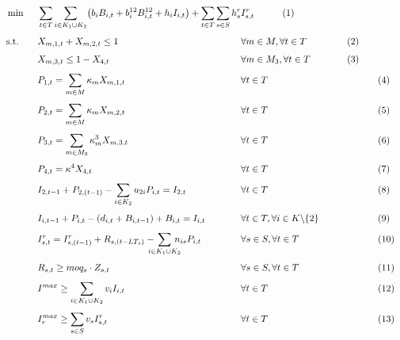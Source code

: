 \documentclass[11pt]{article}
\begin{document}
\begin{alignat}{4}
&\min && \sum_{t\in T}\sum_{i \in K_1 \cup K_2}\bigl(b_iB_{i,t}+b_i^{12}B_{i,t}^{12}+h_iI_{i,t}\bigr)
+ \sum_{t\in T}\sum_{s\in S}h^r_s I^r_{s,t} & \tag{1} \\[4pt]
&\text{s.t.} \quad
&& X_{m,1,t}+X_{m,2,t}\leq 1 && \hspace{-2cm} \forall m\in M,\forall t\in T  &\tag{2} \\[4pt]
&&& X_{m,3,t}\leq 1-X_{4,t} && \hspace{-2cm} \forall m\in M_3,\forall t\in T  &\tag{3} \\[4pt]
&&& P_{1,t}= \sum_{m\in M}\kappa_m X_{m,1,t} && \hspace{-2cm} \forall t\in T &&\tag{4}\\[4pt]
&&& P_{2,t}= \sum_{m\in M}\kappa_m X_{m,2,t} && \hspace{-2cm}\forall t\in T &&\tag{5}\\[4pt]
&&& P_{3,t}= \sum_{m\in M_3}\kappa^{3}_m X_{m,3,t} &&\hspace{-2cm} \forall t\in T &&\tag{6}\\[4pt]
&&& P_{4,t}= \kappa^{4} X_{4,t} &&\hspace{-2cm} \forall t\in T &&\tag{7}\\[4pt]
&&& I_{2,t-1}+P_{2,(t-1)}-\sum_{i\in K_2} u_{2i}P_{i,t} = I_{2,t} \quad && \hspace{-2cm} \forall t\in T &&\tag{8}\\[4pt]
&&& I_{i,t-1}+P_{i,t} - (d_{i,t}+B_{i,t-1})+B_{i,t} = I_{i,t}
&& \hspace{-2cm} \forall t\in T, \forall i\in K\backslash \{2\}  &&\tag{9}\\[4pt]
&&& I_{s,t}^{r}
= I_{s,(t-1)}^{r} + R_{s,(t-LT_s)}
-\hspace{-0.3cm}\sum_{i \in K_1 \cup K_2}\hspace{-0.3cm} n_{is}  P_{i,t}
&& \hspace{-2cm} \forall s\in S,\forall t\in T &&\tag{10}\\[4pt]
&&& R_{s,t} \ge moq_s \cdot Z_{s,t}&& \hspace{-2cm} \forall s\in S,\forall t\in T &&\tag{11}\\[4pt]
&&& I^{max} \geq \sum_{i \in K_1 \cup K_2}v_iI_{i,t} && \hspace{-2cm} \forall t\in T &&\tag{12}\\[4pt]
&&& I_r^{max} \geq \sum_{s\in S}v_sI_{s,t}^{r}&& \hspace{-2cm} \forall t\in T &&\tag{13}\\[4pt]

\end{alignat}
\end{document}
